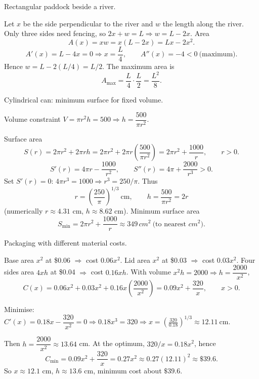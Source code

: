 \documentclass[11pt]{article}
\def\textbf#1{#1}%
\def\mathrm#1{#1}%
\begin{document}
\begin{solution}
\textbf{Rectangular paddock beside a river.}

Let \(x\) be the side perpendicular to the river and \(w\) the length along the river.
Only three sides need fencing, so \(2x+w=L \Rightarrow w=L-2x\).
Area
\[
A(x)=xw=x(L-2x)=Lx-2x^{2}.
\]
\[
A'(x)=L-4x=0 \Rightarrow x=\frac{L}{4},\qquad
A''(x)=-4<0 \ \text{(maximum)}.
\]
Hence \(w=L-2(L/4)=L/2\).
The maximum area is
\[
A_{\max}=\frac{L}{4}\cdot \frac{L}{2}=\frac{L^{2}}{8}.
\]
\end{solution}


\begin{solution}
\textbf{Cylindrical can: minimum surface for fixed volume.}

Volume constraint \(V=\pi r^{2}h=500\Rightarrow h=\dfrac{500}{\pi r^{2}}\).

Surface area
\[
S(r)=2\pi r^{2}+2\pi r h
      =2\pi r^{2}+2\pi r\left(\frac{500}{\pi r^{2}}\right)
      =2\pi r^{2}+\frac{1000}{r},\qquad r>0.
\]
\[
S'(r)=4\pi r-\frac{1000}{r^{2}},\qquad 
S''(r)=4\pi+\frac{2000}{r^{3}}>0.
\]
Set \(S'(r)=0\): \(4\pi r^{3}=1000\Rightarrow r^{3}=250/\pi\).  
Thus
\[
\boxed{\,r=\left(\frac{250}{\pi}\right)^{1/3}\ \text{cm},\qquad
h=\frac{500}{\pi r^{2}}=2r\, } 
\]
(numerically \(r\approx 4.31\) cm, \(h\approx 8.62\) cm).  
Minimum surface area
\[
S_{\min}=2\pi r^{2}+\frac{1000}{r}\approx 349\,\mathrm{cm}^{2}\ \text{(to nearest }\mathrm{cm}^{2}\text{)}.
\]
\end{solution}


\begin{solution}
\textbf{Packaging with different material costs.}

Base area \(x^{2}\) at \$0.06 \(\Rightarrow\) cost \(0.06x^{2}\).  
Lid area \(x^{2}\) at \$0.03 \(\Rightarrow\) cost \(0.03x^{2}\).  
Four sides area \(4xh\) at \$0.04 \(\Rightarrow\) cost \(0.16xh\).  
With volume \(x^{2}h=2000\Rightarrow h=\dfrac{2000}{x^{2}}\),
\[
C(x)=0.06x^{2}+0.03x^{2}+0.16x\left(\frac{2000}{x^{2}}\right)
     =0.09x^{2}+\frac{320}{x},\qquad x>0.
\]

Minimise: \(C'(x)=0.18x-\dfrac{320}{x^{2}}=0
\Rightarrow 0.18x^{3}=320\Rightarrow x=\left(\frac{320}{0.18}\right)^{1/3}\approx 12.11\ \text{cm}.\)

Then \(h=\dfrac{2000}{x^{2}}\approx 13.64\) cm.  
At the optimum, \(320/x=0.18x^{2}\), hence
\[
C_{\min}=0.09x^{2}+\frac{320}{x}=0.27x^{2}
       \approx 0.27(12.11)^{2}\approx \$39.6.
\]
So \(x\approx 12.1\) cm, \(h\approx 13.6\) cm, minimum cost about \(\$39.6\).
\end{solution}
\end{document}
